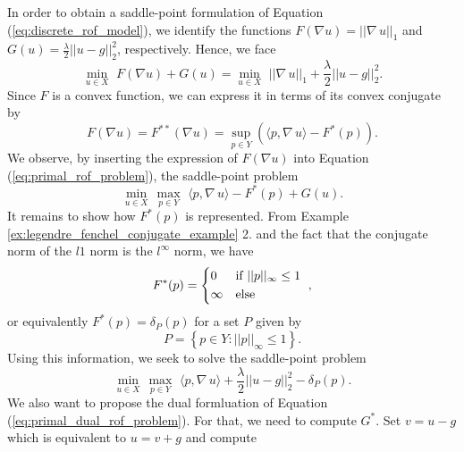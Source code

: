 \documentclass[abstracton]{scrreprt}
\begin{document}
            In order to obtain a saddle-point formulation of Equation (\ref{eq:discrete_rof_model}), we identify the functions $F(\nabla u) = ||\nabla \, u||_{1}$ and $G(u) = \frac{\lambda}{2} ||u - g||_{2}^{2}$, respectively. Hence, we face
                \begin{equation}
                    \min_{u \in X}\,\, F(\nabla u) + G(u) = \min_{u \in X}\,\, ||\nabla \, u||_{1} + \frac{\lambda}{2} ||u - g||_{2}^{2}.
                \label{eq:primal_rof_problem}
                \end{equation}
            Since $F$ is a convex function, we can express it in terms of its convex conjugate by
                $$
                    F(\nabla u) = F^{\ast\ast}(\nabla u) = \sup\limits_{p \in Y} \left(\langle p, \nabla \, u \rangle - F^{\ast}(p) \right).
                $$
            We observe, by inserting the expression of $F(\nabla u)$ into Equation (\ref{eq:primal_rof_problem}), the saddle-point problem
                $$
                    \min_{u \in X}\, \max_{p \in Y}\,\, \langle p, \nabla \, u \rangle - F^{\ast}(p) + G(u).
                $$
            It remains to show how $F^{\ast}(p)$ is represented. From Example \ref{ex:legendre_fenchel_conjugate_example} 2. and the fact that the conjugate norm of the $l1$ norm is the $l^{\infty}$ norm, we have
                $$
                    F^{\ast}(p) =
                        \begin{dcases*}
                            0 & \textnormal{if $||p||_{\infty} \le 1$} \\
                            \infty & \textnormal{else}
                        \end{dcases*},
                $$
            or equivalently $F^{\ast}(p) = \delta_{P}(p)$ for a set $P$ given by
                \begin{equation}
                    P = \left\{ p \in Y : ||p||_{\infty} \le 1 \right\}.
                    \label{eq:the_set_P}
                \end{equation}
            Using this information, we seek to solve the saddle-point problem
                \begin{equation}
                    \min_{u \in X}\, \max_{p \in Y}\,\, \langle p, \nabla\, u \rangle + \frac{\lambda}{2} ||u - g||_{2}^{2} - \delta_{P}(p).
                \label{eq:primal_dual_rof_problem}
                \end{equation}
            We also want to propose the dual formluation of Equation (\ref{eq:primal_dual_rof_problem}). For that, we need to compute $G^{\ast}$. Set $v = u - g$ which is equivalent to $u = v + g$ and compute
\end{document}
